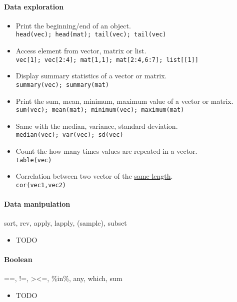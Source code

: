 \documentclass[a4paper,11pt]{article}
\begin{document}
\paragraph{Data exploration} 
\begin{itemize} 
\item Print the beginning/end of an object.\\ 
  \verb!head(vec); head(mat); tail(vec); tail(vec)!
\item Access element from vector, matrix or list.\\ 
  \verb!vec[1]; vec[2:4]; mat[1,1]; mat[2:4,6:7]; list[[1]]!
\item Display summary statistics of a vector or matrix.\\ 
  \verb!summary(vec); summary(mat)!
\item Print the sum, mean, minimum, maximum value of a vector or matrix.\\ 
  \verb!sum(vec); mean(mat); minimum(vec); maximum(mat)!
\item Same with the median, variance, standard deviation.\\ 
  \verb!median(vec); var(vec); sd(vec) !
\item Count the how many times values are repeated in a vector.\\ 
  \verb!table(vec)!
\item Correlation between two vector of the \uline{same length}.\\ 
  \verb!cor(vec1,vec2)!
\end{itemize}


\paragraph{Data manipulation} sort, rev, apply, lapply, (sample), subset
\begin{itemize} 
  \item TODO \\ 
    \verb!!
\end{itemize}


\paragraph{Boolean} ==, !=, ><=, \%in\%, any, which, sum
\begin{itemize} 
  \item TODO \\ 
    \verb!!
\end{itemize}
\end{document}
